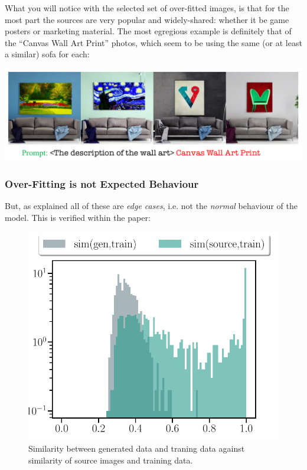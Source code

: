 \documentclass[11pt]{article}
\begin{document}
What you will notice with the selected set of over-fitted images, is that for the most part the sources are very popular and widely-shared: whether it be game posters or marketing material. The most egregious example is definitely that of the ``Canvas Wall Art Print'' photos, which seem to be using the same (or at least a similar) sofa for each:
\begin{center}
\includegraphics[width=.9\linewidth]{./images/replication-stable-diffusion-canvas-wall-art.png}
\end{center}

\subsubsection*{Over-Fitting is not Expected Behaviour}
\label{sec:org499fa5f}
But, as explained all of these are \emph{edge cases}, i.e. not the \emph{normal} behaviour of the model. This is verified within the paper:
\begin{figure}[htbp]
\centering
\includegraphics[width=.9\linewidth]{./images/replication-stable-diffusion-histogram.png}
\caption{Similarity between generated data and traning data against similarity of source images and training data.}
\end{figure}
\end{document}
